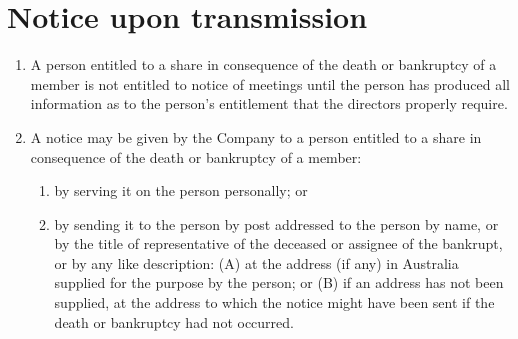 \section{Notice upon transmission}

\begin{enumerate}[label=(\alph*)]
    \item A person entitled to a share in consequence of the death or bankruptcy of a member is not entitled to notice of meetings until the person has produced all information as to the person's entitlement that the directors properly require.
    
    \item A notice may be given by the Company to a person entitled to a share in consequence of the death or bankruptcy of a member:
    \begin{enumerate}[label=(\roman*)]
        \item by serving it on the person personally; or
        \item by sending it to the person by post addressed to the person by name, or by the title of representative of the deceased or assignee of the bankrupt, or by any like description: (A) at the address (if any) in Australia supplied for the purpose by the person; or (B) if an address has not been supplied, at the address to which the notice might have been sent if the death or bankruptcy had not occurred.
    \end{enumerate}
\end{enumerate} 